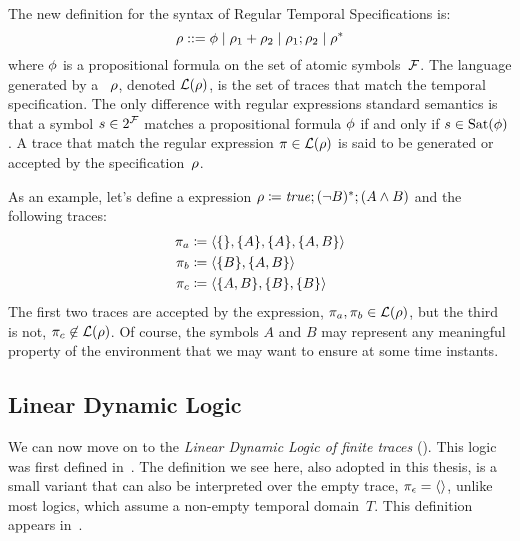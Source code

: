 The new definition for the syntax of Regular Temporal Specifications \re{} is:
\begin{equation}
	\rho ::= \phi \mid
	\rho_1 + \rho_2 \mid \rho_1 ; \rho_2 \mid \rho^*
	\label{eq:re}
\end{equation}
where $\phi$ is a propositional formula on the set of atomic
symbols~$\mathcal{F}$. The language generated by a \re{}~$\rho$, denoted
$\mathcal{L}(\rho)$, is the set of traces that match the temporal
specification. The only difference with regular expressions standard
semantics is that a symbol $s \in 2^{\mathcal{F}}$ matches a propositional formula
$\phi$ if and only if $s \in \text{Sat}(\phi)$. A trace that
match the regular expression $\pi \in \mathcal{L}(\rho)$ is said to be
generated or accepted by the specification~$\rho$.

\begin{example}
	As an example, let's define a \re{} expression $\rho \coloneqq \text{\textit{true}};
	(\neg B)^*; (A \land B)$ and the following traces:
	\begin{align*}
		\pi_a &\coloneqq \langle \{\}, \{A\}, \{A\}, \{A,B\} \rangle \\
		\pi_b &\coloneqq \langle \{B\}, \{A,B\} \rangle \\
		\pi_c &\coloneqq \langle \{A, B\}, \{B\}, \{B\} \rangle \\
	\end{align*}
	The first two traces are accepted by the expression, $\pi_a, \pi_b \in
	\mathcal{L}(\rho)$, but the third is not, $\pi_c \not\in
	\mathcal{L}(\rho)$. Of course, the symbols $A$ and $B$ may represent any
	meaningful property of the environment that we may want to ensure
	at some time instants.
\end{example}


\subsection{Linear Dynamic Logic}

We can now move on to the \emph{Linear Dynamic Logic of finite traces}
(\ldl{}).  This logic was first defined in~\cite{bib:ltlf-ldlf}. The
definition we see here, also adopted in this thesis, is a small variant that
can also be interpreted over the empty trace, $\pi_\epsilon = \langle
\rangle$, unlike most logics, which assume a non-empty temporal domain~$T$.
This definition appears in~\cite{bib:degiacomo-logic-nmrdp}.

